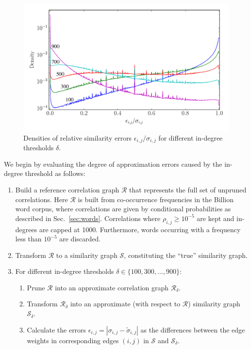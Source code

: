 \documentclass{kais}
\begin{document}
\begin{figure}
\centerline{\includegraphics[width=0.75\columnwidth]{figures/1446451652-relative_error_2.pdf}}
\caption{Densities of relative similarity errors $\epsilon_{i,j}/\sigma_{i,j}$ for different 
in-degree thresholds $\delta$.}
\label{fig:rel-error}
\end{figure}

We begin by evaluating the degree of approximation errors caused by the in-degree threshold as follows:

\begin{enumerate}
\item Build a reference correlation graph $\mathcal{R}$ that represents the full set of unpruned correlations. 
Here $\mathcal{R}$ is built from co-occurrence frequencies in the Billion word corpus, 
where correlations are given by conditional probabilities as described in Sec.\ \ref{sec:words}.
Correlations where $\rho_{i,j} \geq 10^{-5}$ are kept and in-degrees are capped at 1000.
Furthermore, words occurring with a frequency less than $10^{-5}$ are discarded.
\item Transform $\mathcal{R}$ to a similarity graph $\mathcal{S}$, constituting the ``true'' similarity graph.
\item For different in-degree thresholds $\delta \in \{100, 300, ..., 900\}$:
\begin{enumerate}
\item Prune $\mathcal{R}$ into an approximate correlation graph $\mathcal{R}_{\delta}$.
\item Transform $\mathcal{R}_{\delta}$ into an approximate (with respect to $\mathcal{R}$) similarity 
graph $\mathcal{S}_{\delta}$. 
\item Calculate the errors $\epsilon_{i,j} = |\sigma_{i,j} - \tilde{\sigma}_{i,j}|$ as the differences between
the edge weights in corresponding edges $(i,j)$ in $\mathcal{S}$ and $\mathcal{S}_{\delta}$.
\end{enumerate}
\end{enumerate}
\end{document}
